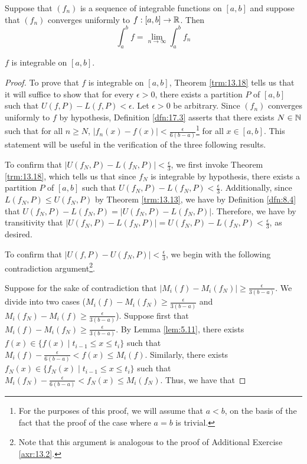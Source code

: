 \documentclass[../main.tex]{subfiles}
\begin{document}
\begin{theorem}\label{trm:17.7}
    Suppose that $(f_n)$ is a sequence of integrable functions on $[a,b]$ and suppose that $(f_n)$ converges uniformly to $f:[a,b]\to\mathbb{R}$. Then
    \begin{equation*}
        \int_a^bf = \lim_{n\to\infty}\int_a^bf_n
    \end{equation*}
    \begin{lemma*}
        $f$ is integrable on $[a,b]$.
        \begin{proof}
            To prove that $f$ is integrable on $[a,b]$, Theorem \ref{trm:13.18} tells us that it will suffice to show that for every $\epsilon>0$, there exists a partition $P$ of $[a,b]$ such that $U(f,P)-L(f,P)<\epsilon$. Let $\epsilon>0$ be arbitrary. Since $(f_n)$ converges uniformly to $f$ by hypothesis, Definition \ref{dfn:17.3} asserts that there exists $N\in\mathbb{N}$ such that for all $n\geq N$, $|f_n(x)-f(x)|<\frac{\epsilon}{6(b-a)}$\footnote{For the purposes of this proof, we will assume that $a<b$, on the basis of the fact that the proof of the case where $a=b$ is trivial.} for all $x\in[a,b]$. This statement will be useful in the verification of the three following results.\par\medskip
            To confirm that $|U(f_N,P)-L(f_N,P)|<\frac{\epsilon}{3}$, we first invoke Theorem \ref{trm:13.18}, which tells us that since $f_N$ is integrable by hypothesis, there exists a partition $P$ of $[a,b]$ such that $U(f_N,P)-L(f_N,P)<\frac{\epsilon}{3}$. Additionally, since $L(f_N,P)\leq U(f_N,P)$ by Theorem \ref{trm:13.13}, we have by Definition \ref{dfn:8.4} that $U(f_N,P)-L(f_N,P)=|U(f_N,P)-L(f_N,P)|$. Therefore, we have by transitivity that $|U(f_N,P)-L(f_N,P)|=U(f_N,P)-L(f_N,P)<\frac{\epsilon}{3}$, as desired.\par\medskip
            To confirm that $|U(f,P)-U(f_N,P)|<\frac{\epsilon}{3}$, we begin with the following contradiction argument\footnote{Note that this argument is analogous to the proof of Additional Exercise \ref{axr:13.2}.}.\par
            Suppose for the sake of contradiction that $|M_i(f)-M_i(f_N)|\geq\frac{\epsilon}{3(b-a)}$. We divide into two cases ($M_i(f)-M_i(f_N)\geq\frac{\epsilon}{3(b-a)}$ and $M_i(f_N)-M_i(f)\geq\frac{\epsilon}{3(b-a)}$). Suppose first that $M_i(f)-M_i(f_N)\geq\frac{\epsilon}{3(b-a)}$. By Lemma \ref{lem:5.11}, there exists $f(x)\in\{f(x)\mid t_{i-1}\leq x\leq t_i\}$ such that $M_i(f)-\frac{\epsilon}{6(b-a)}<f(x)\leq M_i(f)$. Similarly, there exists $f_N(x)\in\{f_N(x)\mid t_{i-1}\leq x\leq t_i\}$ such that $M_i(f_N)-\frac{\epsilon}{6(b-a)}<f_N(x)\leq M_i(f_N)$. Thus, we have that

\end{proof}
\end{lemma*}
\end{theorem}
\end{document}
